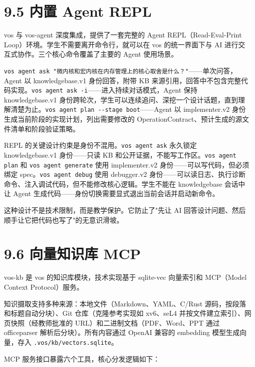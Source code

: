 \documentclass[UTF8,a4paper,12pt,openany]{ctexrep}
\newcommand{\passthrough}[1]{#1}
\begin{document}
\section{9.5 内置 Agent REPL}\label{95-ux5185ux7f6e-agent-repl}

vos 与 vos-agent 深度集成，提供了一套完整的 Agent REPL（Read-Eval-Print Loop）环境。学生不需要离开命令行，就可以在 vos 的统一界面下与 AI 进行交互式协作。三个核心命令覆盖了主要的 Agent 使用场景。

\passthrough{\lstinline!vos agent ask "微内核和宏内核在内存管理上的核心取舍是什么？"!}------单次问答，Agent 以 knowledgebase.v1 身份回答，附带 KB 来源引用，回答中不包含完整代码实现。\passthrough{\lstinline!vos agent ask -i!}------进入持续对话模式，Agent 保持 knowledgebase.v1 身份跨轮次，学生可以连续追问、深挖一个设计话题，直到理解清楚为止。\passthrough{\lstinline!vos agent plan --stage boot!}------Agent 以 implementer.v2 身份生成当前阶段的实现计划，列出需要修改的 OperationContract、预计生成的源文件清单和阶段验证策略。

REPL 的关键设计约束是身份不混用。\passthrough{\lstinline!vos agent ask!} 永久锁定 knowledgebase.v1 身份------只读 KB 和公开证据，不能写工作区。\passthrough{\lstinline!vos agent plan!} 和 \passthrough{\lstinline!vos agent generate!} 使用 implementer.v2 身份------可以写代码，但必须绑定 spec。\passthrough{\lstinline!vos agent debug!} 使用 debugger.v2 身份------可以读日志、执行诊断命令、注入调试代码，但不能修改核心逻辑。学生不能在 knowledgebase 会话中让 Agent 生成代码------身份切换需要显式退出当前会话并启动新命令。

这种设计不是技术限制，而是教学保护。它防止了"先让 AI 回答设计问题、然后顺手让它把代码也写了"的无意识滑坡。

\section{9.6 向量知识库 MCP}\label{96-ux5411ux91cfux77e5ux8bc6ux5e93-mcp}

vos-kb 是 vos 的知识库模块，技术实现基于 sqlite-vec 向量索引和 MCP（Model Context Protocol）服务。

知识摄取支持多种来源：本地文件（Markdown、YAML、C/Rust 源码，按段落和标题自动分块）、Git 仓库（克隆参考实现如 xv6、seL4 并按文件建立索引）、网页快照（经教师批准的 URL）和二进制文档（PDF、Word、PPT 通过 officeparser 解析后分块）。所有内容通过 OpenAI 兼容的 embedding 模型生成向量，存入 \passthrough{\lstinline!.vos/kb/vectors.sqlite!}。

MCP 服务接口暴露六个工具，核心分发逻辑如下：
\end{document}
